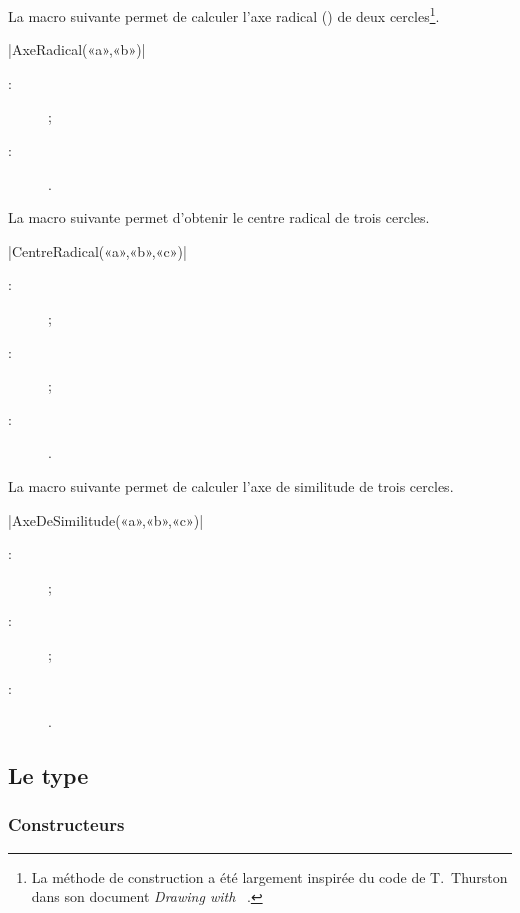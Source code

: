 \documentclass[a4paper,french]{article}
\begin{document}
La macro suivante permet de calculer l'axe radical () de deux
cercles\footnote{La méthode de construction a été largement inspirée du code de
T.~Thurston dans son document \emph{Drawing with \MP}~\cite{ctan-drawing-with-metapost}.}.
\begin{colourband}
\macro|AxeRadical(«a»,«b»)|
\begin{description}
  \item[:]   ;
  \item[:]  .
\end{description}
\end{colourband}
\bigskip

La macro suivante permet d'obtenir le centre radical de trois cercles.
\begin{colourband}
\macro|CentreRadical(«a»,«b»,«c»)|
\begin{description}
  \item[:]   ;
  \item[:]   ;
  \item[:]  .
\end{description}
\end{colourband}
\bigskip

La macro suivante permet de calculer l'axe de similitude de trois cercles.
\begin{colourband}
\macro|AxeDeSimilitude(«a»,«b»,«c»)|
\begin{description}
  \item[:]   ;
  \item[:]   ;
  \item[:]  .
\end{description}
\end{colourband}
\bigskip

\subsection{Le type }
\subsubsection{Constructeurs}
\end{document}
